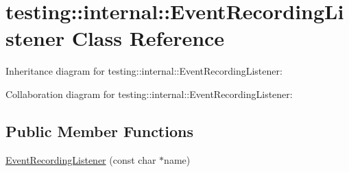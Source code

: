 \hypertarget{classtesting_1_1internal_1_1_event_recording_listener}{}\section{testing\+:\+:internal\+:\+:Event\+Recording\+Listener Class Reference}
\label{classtesting_1_1internal_1_1_event_recording_listener}


Inheritance diagram for testing\+:\+:internal\+:\+:Event\+Recording\+Listener\+:


Collaboration diagram for testing\+:\+:internal\+:\+:Event\+Recording\+Listener\+:
\subsection*{Public Member Functions}
\begin{DoxyCompactItemize}
\item 
\hyperlink{classtesting_1_1internal_1_1_event_recording_listener_a7b0254c15d6b8468e1441ee572fee707}{Event\+Recording\+Listener} (const char $\ast$name)
\end{DoxyCompactItemize}
